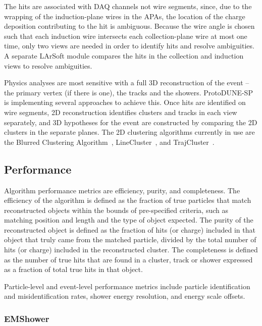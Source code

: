 The hits are associated with DAQ channels 
not wire segments, since, due to the wrapping of the induction-plane
wires in the APAs, the location of the %
charge deposition contributing to the hit is ambiguous. %
Because the wire angle
is chosen such that each induction wire intersects each collection-plane
wire at most one time, only two views are needed in order to identify
hits and resolve ambiguities.  A separate LArSoft module compares the
hits in the collection and induction views to
resolve ambiguities.  

Physics analyses are most sensitive with a full 3D reconstruction of the
event -- the primary vertex (if there is one), the tracks and the showers.
ProtoDUNE-SP is implementing several approaches to achieve this. Once hits are identified on wire
segments, 2D reconstruction identifies clusters and tracks
in each view separately, and 3D hypotheses for
the event are constructed by comparing the 2D clusters
in the separate planes.  The 2D clustering algorithms currently in
use are the Blurred Clustering Algorithm~\cite{blurredcluster},
LineCluster~\cite{linecluster}, and TrajCluster~\cite{trajcluster}.  

\subsection{Performance}

Algorithm performance metrics are efficiency, purity, and completeness.  The
efficiency of the algorithm is defined as the fraction of true particles that
match reconstructed objects within the bounds of pre-specified
criteria, such as matching position and length and the type of object
expected.  The purity of the reconstructed object is defined as the fraction of
hits (or charge) included in that object that truly came from the
matched particle, divided by the total number of hits (or charge)
included in the reconstructed cluster.  The completeness is defined as
the number of true hits that are found in a cluster, track or shower
expressed as a fraction of total true hits in that object.  

Particle-level and event-level performance metrics include particle identification
and misidentification rates, shower energy resolution, and energy scale offsets.


\subsubsection{EMShower}

